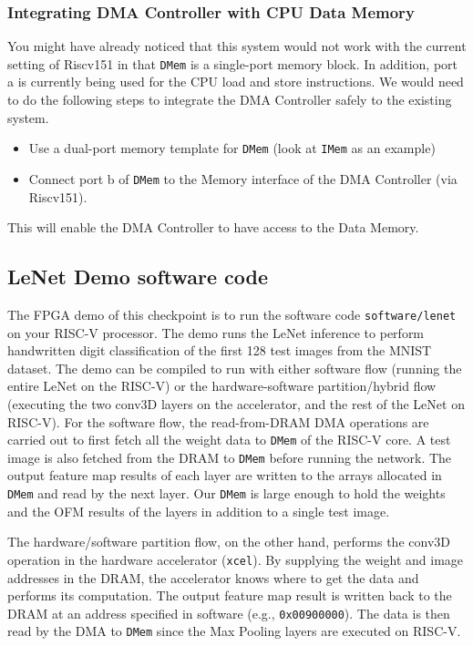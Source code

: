 \documentclass[11pt]{article}
\begin{document}
\subsubsection{Integrating DMA Controller with CPU Data Memory}

You might have already noticed that this system would not work with the current setting of Riscv151 in that \texttt{DMem} is a single-port memory block. In addition, port a is currently being used for the CPU load and store instructions. We would need to do the following steps to integrate the DMA Controller safely to the existing system.

\begin{itemize}
\item Use a dual-port memory template for \texttt{DMem} (look at \texttt{IMem} as an example)
\item Connect port b of \texttt{DMem} to the Memory interface of the DMA Controller (via Riscv151).
\end{itemize}

This will enable the DMA Controller to have access to the Data Memory.
\subsection{LeNet Demo software code}

The FPGA demo of this checkpoint is to run the software code \verb|software/lenet| on your RISC-V processor. The demo runs the LeNet inference to perform handwritten digit classification of the first 128 test images from the MNIST dataset. The demo can be compiled to run with either software flow (running the entire LeNet on the RISC-V) or the hardware-software partition/hybrid flow (executing the two conv3D layers on the accelerator, and the rest of the LeNet on RISC-V). For the software flow, the read-from-DRAM DMA operations are carried out to first fetch all the weight data to \texttt{DMem} of the RISC-V core. A test image is also fetched from the DRAM to \texttt{DMem} before running the network. The output feature map results of each layer are written to the arrays allocated in \texttt{DMem} and read by the next layer. Our \texttt{DMem} is large enough to hold the weights and the OFM results of the layers in addition to a single test image.

The hardware/software partition flow, on the other hand, performs the conv3D operation in the hardware accelerator (\texttt{xcel}). By supplying the weight and image addresses in the DRAM, the accelerator knows where to get the data and performs its computation. The output feature map result is written back to the DRAM at an address specified in software (e.g., \verb|0x00900000|). The data is then read by the DMA to \texttt{DMem} since the Max Pooling layers are executed on RISC-V.
\end{document}
